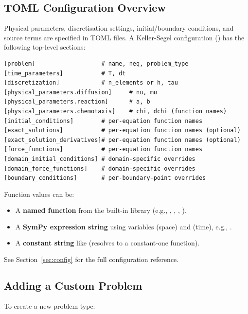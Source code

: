 \subsection{TOML Configuration Overview}

Physical parameters, discretisation settings, initial/boundary conditions, and source terms are specified in TOML files.  A Keller-Segel configuration () has the following top-level sections:

\begin{lstlisting}[caption={TOML configuration structure}]
[problem]                   # name, neq, problem_type
[time_parameters]           # T, dt
[discretization]            # n_elements or h, tau
[physical_parameters.diffusion]     # nu, mu
[physical_parameters.reaction]      # a, b
[physical_parameters.chemotaxis]    # chi, dchi (function names)
[initial_conditions]        # per-equation function names
[exact_solutions]           # per-equation function names (optional)
[exact_solution_derivatives]# per-equation function names (optional)
[force_functions]           # per-equation function names
[domain_initial_conditions] # domain-specific overrides
[domain_force_functions]    # domain-specific overrides
[boundary_conditions]       # per-boundary-point overrides
\end{lstlisting}

Function values can be:
\begin{itemize}
    \item A \textbf{named function} from the built-in library (e.g., , , , ).
    \item A \textbf{SymPy expression string} using variables  (space) and  (time), e.g., .
    \item A \textbf{constant string} like  (resolves to a constant-one function).
\end{itemize}

See Section~\ref{sec:config} for the full configuration reference.

\subsection{Adding a Custom Problem}

To create a new problem type:

